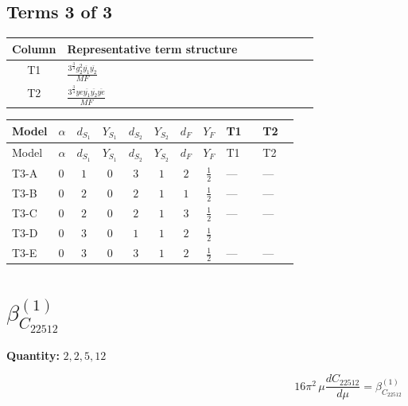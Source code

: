 \documentclass[8pt]{article}
\begin{document}
\begin{landscape}
\subsection*{Terms 3 of 3}
\begin{center}
\begin{tabular}{@{}c >{\raggedright\arraybackslash}p{0.82\linewidth}@{}}
\toprule
Column & Representative term structure \\
\midrule
T1 & \(\displaystyle \frac{3^{\frac{3}{4}} g_{2}^{2} \overline{y_{1}} \overline{y_{2}}}{MF}\) \\
\midrule
T2 & \(\displaystyle \frac{3^{\frac{3}{4}} ye \overline{y_{1}} \overline{y_{2}} \overline{ye}}{MF}\) \\
\midrule
\bottomrule
\end{tabular}
\end{center}
\smallskip
\tiny
\begin{longtable}{@{}llcccccc >{\raggedright\arraybackslash}p{0.21\linewidth} >{\raggedright\arraybackslash}p{0.21\linewidth}@{}}
\toprule
Model & $\alpha$ & $d_{S_1}$ & $Y_{S_1}$ & $d_{S_2}$ & $Y_{S_2}$ & $d_F$ & $Y_F$ & T1 & T2 \\
\midrule
\endfirsthead
\toprule
Model & $\alpha$ & $d_{S_1}$ & $Y_{S_1}$ & $d_{S_2}$ & $Y_{S_2}$ & $d_F$ & $Y_F$ & T1 & T2 \\
\midrule
\endhead
T3-A & $0$ & $1$ & $0$ & $3$ & $1$ & $2$ & $\frac{1}{2}$ & --- & --- \\
\midrule
T3-B & $0$ & $2$ & $0$ & $2$ & $1$ & $1$ & $\frac{1}{2}$ & --- & --- \\
\midrule
T3-C & $0$ & $2$ & $0$ & $2$ & $1$ & $3$ & $\frac{1}{2}$ & --- & --- \\
\midrule
T3-D & $0$ & $3$ & $0$ & $1$ & $1$ & $2$ & $\frac{1}{2}$ & \scriptsize\adjustbox{max width=\linewidth}{$\begin{gathered} \frac{11 \cdot 3^{\frac{3}{4}} g_{2}^{2} \overline{y_{1}} \overline{y_{2}}}{8 MF}\end{gathered}$} & \scriptsize\adjustbox{max width=\linewidth}{$\begin{gathered} - \frac{3^{\frac{3}{4}} ye \overline{y_{1}} \overline{y_{2}} \overline{ye}}{12 MF}\end{gathered}$} \\
\midrule
T3-E & $0$ & $3$ & $0$ & $3$ & $1$ & $2$ & $\frac{1}{2}$ & --- & --- \\
\midrule
\bottomrule
\end{longtable}
\clearpage
\section*{$\beta_{C_{22512}}^{(1)}$}
\noindent\textbf{Quantity: }$\mathrm{2,2,5,12}$\par\smallskip
\[16\pi^2\,\mu\frac{d C_{22512}}{d\mu}=\beta_{C_{22512}}^{(1)}\]

\end{landscape}
\end{document}
